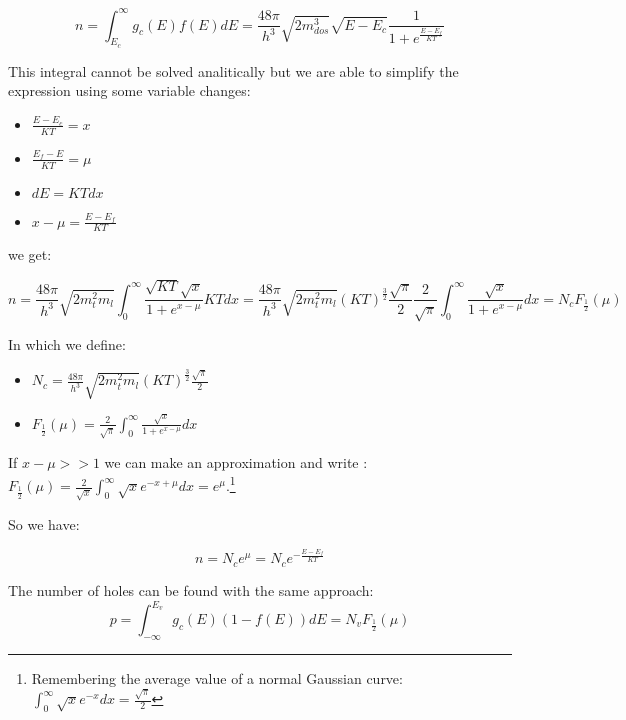 			\begin{equation}
				n=\int_{E_c}^{\infty}g_c(E)f(E)dE= \frac{48\pi}{h^3}\sqrt{2 m_{dos}^3} \sqrt{E-E_c}\frac{1}{1+e^{ \frac{E-E_f}{KT} } }
			\end{equation}

			This integral cannot be solved analitically but we are able to simplify the expression using some variable changes:

			\begin{itemize}
				\item $\frac{E-E_c}{KT}=x$
				\item $\frac{E_f-E}{KT}=\mu$
				\item $dE=KTdx$
				\item $x-\mu=\frac{E-E_f}{KT}$
			\end{itemize}
			 
			 we get:

			 \begin{equation}
				n=\frac{48\pi}{h^3}\sqrt{2 m_t^2m_l} \int_0^{\infty} \frac{\sqrt{KT}\sqrt{x}}{1+e^{x- \mu}}KTdx=\frac{48\pi}{h^3}\sqrt{2 m_t^2m_l} (KT)^{\frac{3}{2}} \frac{\sqrt{ \pi}}{2} \frac{2}{\sqrt{ \pi}} \int_0^{\infty} \frac{\sqrt{x}}{1+e^{x- \mu}}dx=N_cF_{\frac{1}{2}}( \mu) 	
			 \end{equation}

			In which we define:

			\begin{itemize}
				\item $N_c=\frac{48\pi}{h^3}\sqrt{2 m_t^2m_l} (KT)^{\frac{3}{2}} \frac{\sqrt{ \pi}}{2}$
				\item $ F_{\frac{1}{2}}( \mu)= \frac{2}{ \sqrt{ \pi}} \int_0^{\infty} \frac{\sqrt{x}}{1+e^{x- \mu}} dx $	
			\end{itemize}

			If $x- \mu >> 1$ we can make an approximation and write : $F_{\frac{1}{2}}( \mu)=\frac{2}{\sqrt{x}}\int_0^{\infty}\sqrt{x}e^{-x+ \mu}dx= e^{ \mu}$.\footnote{Remembering the average value of a normal Gaussian curve: $\int_0^{\infty}\sqrt{x}e^{-x}dx=\frac{\sqrt{\pi}}{2}$}

			So we have:

			\begin{equation}
				n=N_ce^ {\mu}= N_ce^ {-\frac{E-E_f}{KT}}
			\end{equation}

			The number of holes can be found with the same approach:
			\begin{equation}
				p= \int_{-\infty}^{E_v} g_c(E)(1-f(E)) dE=N_vF_{\frac {1} {2} }( \mu)
			\end{equation}

